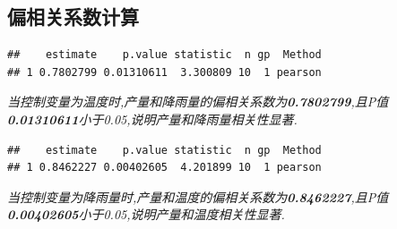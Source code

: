 \documentclass[
]{article}
\newenvironment{Shaded}{\begin{snugshade}}{\end{snugshade}}
\newcommand{\AttributeTok}[1]{\textcolor[rgb]{0.13,0.29,0.53}{#1}}
\newcommand{\CommentTok}[1]{\textcolor[rgb]{0.56,0.35,0.01}{\textit{#1}}}
\newcommand{\FunctionTok}[1]{\textcolor[rgb]{0.13,0.29,0.53}{\textbf{#1}}}
\newcommand{\NormalTok}[1]{#1}
\newcommand{\OtherTok}[1]{\textcolor[rgb]{0.56,0.35,0.01}{#1}}
\newcommand{\SpecialCharTok}[1]{\textcolor[rgb]{0.81,0.36,0.00}{\textbf{#1}}}
\newcommand{\StringTok}[1]{\textcolor[rgb]{0.31,0.60,0.02}{#1}}
\begin{document}
\subsection{偏相关系数计算}\label{ux504fux76f8ux5173ux7cfbux6570ux8ba1ux7b97}

\begin{Shaded}
\end{Shaded}

\begin{verbatim}
##    estimate    p.value statistic  n gp  Method
## 1 0.7802799 0.01310611  3.300809 10  1 pearson
\end{verbatim}

\emph{当控制变量为温度时,产量和降雨量的偏相关系数为\textbf{0.7802799},且P值\textbf{0.01310611}小于0.05,说明产量和降雨量相关性显著.}

\begin{Shaded}
\end{Shaded}

\begin{verbatim}
##    estimate    p.value statistic  n gp  Method
## 1 0.8462227 0.00402605  4.201899 10  1 pearson
\end{verbatim}

\emph{当控制变量为降雨量时,产量和温度的偏相关系数为\textbf{0.8462227},且P值\textbf{0.00402605}小于0.05,说明产量和温度相关性显著.}
\end{document}
